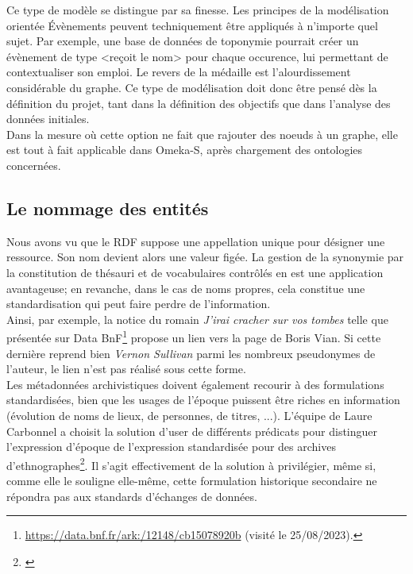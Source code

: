 \documentclass[a4paper,12pt,twoside]{book}
\begin{document}
Ce type de modèle se distingue par sa finesse. Les principes de la modélisation orientée Évènements peuvent techniquement être appliqués à n'importe quel sujet. Par exemple, une base de données de toponymie pourrait créer un évènement de type \textless reçoit le nom\textgreater{} pour chaque occurence, lui permettant de contextualiser son emploi. Le revers de la médaille est l'alourdissement considérable du graphe. Ce type de modélisation doit donc être pensé dès la définition du projet, tant dans la définition des objectifs que dans l'analyse des données initiales.\\

Dans la mesure où cette option ne fait que rajouter des noeuds à un graphe, elle est tout à fait applicable dans Omeka-S, après chargement des ontologies concernées. 

\subsection{Le nommage des entités}
Nous avons vu que le RDF suppose une appellation unique pour désigner une ressource. Son nom devient alors une valeur figée. La gestion de la synonymie par la constitution de thésauri et de vocabulaires contrôlés en est une application avantageuse; en revanche, dans le cas de noms propres, cela constitue une standardisation qui peut faire perdre de l'information.\\

Ainsi, par exemple, la notice du romain \textit{J'irai cracher sur vos tombes} telle que présentée sur Data BnF\footnote{\url{https://data.bnf.fr/ark:/12148/cb15078920b} (visité le 25/08/2023).} propose un lien vers la page de Boris Vian. Si cette dernière reprend bien \textit{Vernon Sullivan} parmi les nombreux pseudonymes de l'auteur, le lien n'est pas réalisé sous cette forme.\\

Les métadonnées archivistiques doivent également recourir à des formulations standardisées, bien que les usages de l'époque puissent être riches en information (évolution de noms de lieux, de personnes, de titres, ...). L'équipe de Laure Carbonnel a choisit la solution d'user de différents prédicats pour distinguer l'expression d'époque de l'expression standardisée pour des archives d'ethnographes\footnote{\cite[p.~18-19]{carbonnelArchivesSciencesHumaines2017}}. Il s'agit effectivement de la solution à privilégier, même si, comme elle le souligne elle-même, cette formulation historique secondaire ne répondra pas aux standards d'échanges de données. 
\end{document}
